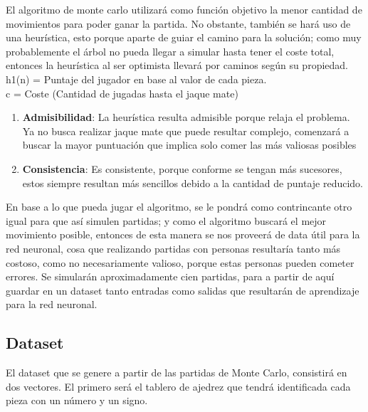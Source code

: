 

El algoritmo de monte carlo utilizará como función objetivo la menor cantidad de movimientos para poder ganar la partida. No obstante, también se hará uso de una heurística, esto porque aparte de guiar el camino para la solución; como muy probablemente el árbol no pueda llegar a simular hasta tener el coste total, entonces la heurística al ser optimista llevará por caminos según su propiedad. \\

h1(n) = Puntaje del jugador en base al valor de cada pieza.\\

c = Coste (Cantidad de jugadas hasta el jaque mate)

\begin{enumerate}
	\item \textbf{Admisibilidad}: La heurística resulta admisible porque relaja el problema. Ya no busca realizar jaque mate que puede resultar complejo, comenzará a buscar la mayor puntuación que implica solo comer las más valiosas posibles
	\item \textbf{Consistencia}: Es consistente, porque conforme se tengan más sucesores, estos siempre resultan más sencillos debido a la cantidad de puntaje reducido.
\end{enumerate}

En base a lo que pueda jugar el algoritmo, se le pondrá como contrincante otro igual para que así simulen partidas; y como el algoritmo buscará el mejor movimiento posible, entonces de esta manera se nos proveerá de data útil para la red neuronal, cosa que realizando partidas con personas resultaría tanto más costoso, como no necesariamente valioso, porque estas personas pueden cometer errores. Se simularán aproximadamente cien partidas, para a partir de aquí guardar en un dataset tanto entradas como salidas que resultarán de aprendizaje para la red neuronal.

\subsection{Dataset}
El dataset que se genere a partir de las partidas de Monte Carlo, consistirá en dos vectores. El primero será el tablero de ajedrez que tendrá identificada cada pieza con un número y un signo.


